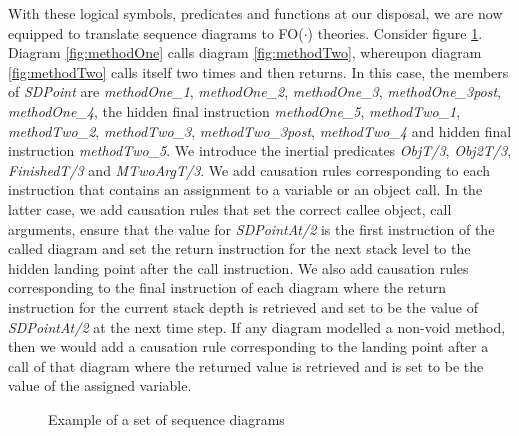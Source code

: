 \documentclass[conference]{IEEEtran}
\begin{document}
With these logical symbols, predicates and functions at our disposal, we are now equipped to translate sequence diagrams to FO($\cdot$) theories. Consider figure \ref{fig:recursion}. Diagram \ref{fig:methodOne} calls diagram \ref{fig:methodTwo}, whereupon diagram \ref{fig:methodTwo} calls itself two times and then returns. In this case, the members of \textit{SDPoint} are \textit{methodOne\_1}, \textit{methodOne\_2}, \textit{methodOne\_3}, \textit{methodOne\_3post}, \textit{methodOne\_4}, the hidden final instruction \textit{methodOne\_5}, \textit{methodTwo\_1}, \textit{methodTwo\_2}, \textit{methodTwo\_3}, \textit{methodTwo\_3post}, \textit{methodTwo\_4} and hidden final instruction \textit{methodTwo\_5}. We introduce the inertial predicates \textit{ObjT/3}, \textit{Obj2T/3}, \textit{FinishedT/3} and \textit{MTwoArgT/3}. We add causation rules corresponding to each instruction that contains an assignment to a variable or an object call. In the latter case, we add causation rules that set the correct callee object, call arguments, ensure that the value for \textit{SDPointAt/2} is the first instruction of the called diagram and set the return instruction for the next stack level to the hidden landing point after the call instruction. We also add causation rules corresponding to the final instruction of each diagram where the return instruction for the current stack depth is retrieved and set to be the value of \textit{SDPointAt/2} at the next time step. If any diagram modelled a non-void method, then we would add a causation rule corresponding to the landing point after a call of that diagram where the returned value is retrieved and is set to be the value of the assigned variable.

\begin{figure}[!t]
\centering
{}
\hfil
{}
\caption{Example of a set of sequence diagrams}
\label{fig:recursion}
\end{figure}
\end{document}
